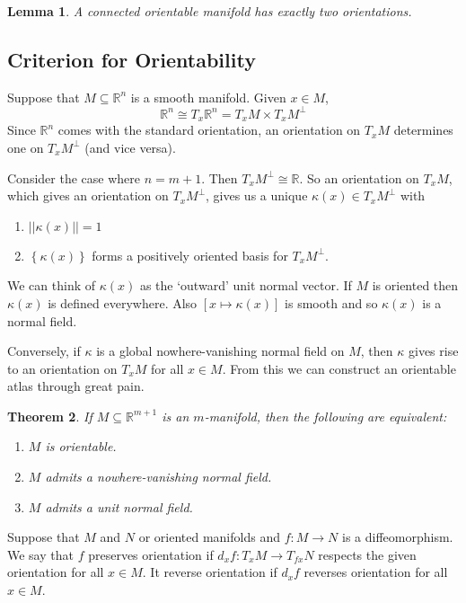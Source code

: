 \documentclass[11pt]{article}
\newcommand{\norm}[1]{||#1||}
\newcommand{\R}{\mathbb{R}}
\newenvironment{defin}
	{\begin{mdframed}[backgroundcolor=white, roundcorner=5pt, linewidth=1pt, linecolor=RoyalBlue]
		\setlength{\parindent}{0pt}}
	{\end{mdframed}}
\newcommand{\mdf}[1]{{\color{RoyalBlue} #1}}
\newtheorem{theorem}{Theorem}[section]
\newtheorem{lemma}[theorem]{Lemma}
\begin{document}
\begin{lemma}
A connected orientable manifold has exactly two orientations.
\end{lemma}

\subsection{Criterion for Orientability}
Suppose that $M\subseteq \R^n$ is a smooth manifold.
Given $x\in M$, 
\[
\R^n\cong T_x\R^n = T_xM \times T_xM^\perp
\]
Since $\R^n$ comes with the standard orientation, an orientation on $T_xM$ determines one on $T_xM^\perp$ (and vice versa).

Consider the case where $n=m+1$.
Then $T_xM^\perp\cong \R$.
So an orientation on $T_xM$, which gives an orientation on $T_xM^\perp$, gives us a unique $\kappa(x)\in T_xM^\perp$ with 
\begin{enumerate}
	\item $\norm{\kappa(x)}=1$
	\item $\left\{ \kappa(x)\right\}$ forms a positively oriented basis for $T_xM^\perp$.
\end{enumerate}

We can think of $\kappa(x)$ as the `outward' unit normal vector.
If $M$ is oriented then $\kappa(x)$ is defined everywhere.
Also $[x\mapsto \kappa(x)]$ is smooth and so $\kappa(x)$ is a normal field.

Conversely, if $\kappa$ is a global nowhere-vanishing normal field on $M$, then $\kappa$ gives rise to an orientation on $T_xM$ for all $x\in M$.
From this we can construct an orientable atlas through great pain.

\begin{theorem}
If $M\subseteq\R^{m+1}$ is an $m$-manifold, then the following are equivalent:
\begin{enumerate}[label=(\alph*)]
	\item $M$ is orientable.
	\item $M$ admits a nowhere-vanishing normal field.
	\item $M$ admits a unit normal field.
\end{enumerate}
\end{theorem}

\begin{defin}
Suppose that $M$ and $N$ or oriented manifolds and $f:M\to N$ is a diffeomorphism.
We say that $f$ \mdf{preserves orientation} if $d_xf:T_xM \to T_{fx}N$ respects the given orientation for all $x\in M$.
It \mdf{reverse orientation} if $d_xf$ reverses orientation for all $x\in M$.
\end{defin}
\end{document}
